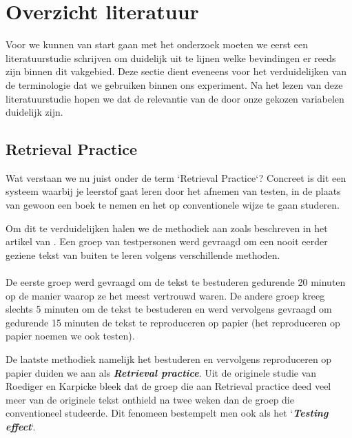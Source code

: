 \documentclass{hogent-article}
\newcommand{\boldit}[1]{\emph{\textbf{#1}}}
\begin{document}
\section{Overzicht literatuur}

Voor we kunnen van start gaan met het onderzoek moeten we eerst een literatuurstudie schrijven om duidelijk uit te lijnen welke bevindingen er reeds zijn binnen dit vakgebied. Deze sectie dient eveneens voor het verduidelijken van de terminologie dat we gebruiken binnen ons experiment. Na het lezen van deze literatuurstudie hopen we dat de relevantie van de door onze gekozen variabelen duidelijk zijn.

\subsection{Retrieval Practice}
\label{RetrievalPractice}
Wat verstaan we nu juist onder de term `Retrieval Practice`? Concreet is dit een systeem waarbij je leerstof gaat leren door het afnemen van testen, in de plaats van gewoon een boek te nemen en het op conventionele wijze te gaan studeren.\\
\par
\noindent
Om dit te verduidelijken halen we de methodiek aan zoals beschreven in het artikel van \textcite{Roediger_2006}. Een groep van testpersonen werd gevraagd om een nooit eerder geziene tekst van buiten te leren volgens verschillende methoden.\\\\De eerste groep werd gevraagd om de tekst te bestuderen gedurende 20 minuten op de manier waarop ze het meest vertrouwd waren. De andere groep kreeg slechts 5 minuten om de tekst te bestuderen en werd vervolgens gevraagd om gedurende 15 minuten de tekst te reproduceren op papier (het reproduceren op papier noemen we ook testen).\\

\par
\noindent
De laatste methodiek namelijk het bestuderen en vervolgens reproduceren op papier duiden we aan als \boldit{Retrieval practice}. Uit de originele studie van Roediger en Karpicke bleek dat de groep die aan Retrieval practice deed veel meer van de originele tekst onthield na twee weken dan de groep die conventioneel studeerde. Dit fenomeen bestempelt men ook als het `\boldit{Testing effect}`.
\end{document}
